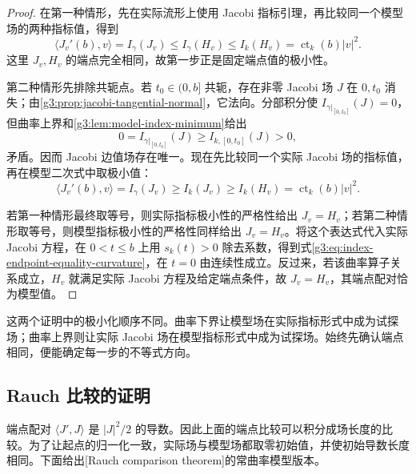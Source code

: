 \begin{proof}
	在第一种情形，先在实际流形上使用 Jacobi 指标引理，再比较同一个模型场的两种指标值，得到
	\[
		\langle J_v'(b),v\rangle
		=I_\gamma(J_v)\le I_\gamma(H_v)
		\le I_k(H_v)=\operatorname{ct}_k(b)|v|^2.
	\]
	这里 \(J_v,H_v\) 的端点完全相同，故第一步正是固定端点值的极小性。

	第二种情形先排除共轭点。若 \(t_0\in(0,b]\) 共轭，存在非零 Jacobi 场 \(J\) 在 \(0,t_0\) 消失；由\cref{g3:prop:jacobi-tangential-normal}，它法向。分部积分使 \(I_{\gamma|_{[0,t_0]}}(J)=0\)，但曲率上界和\cref{g3:lem:model-index-minimum}给出
	\[
		0=I_{\gamma|_{[0,t_0]}}(J)\ge I_{k,[0,t_0]}(J)>0,
	\]
	矛盾。因而 Jacobi 边值场存在唯一。现在先比较同一个实际 Jacobi 场的指标值，再在模型二次式中取极小值：
	\[
		\langle J_v'(b),v\rangle
		=I_\gamma(J_v)\ge I_k(J_v)
		\ge I_k(H_v)=\operatorname{ct}_k(b)|v|^2.
	\]

	若第一种情形最终取等号，则实际指标极小性的严格性给出 \(J_v=H_v\)；若第二种情形取等号，则模型指标极小性的严格性同样给出 \(J_v=H_v\)。将这个表达式代入实际 Jacobi 方程，在 \(0<t\le b\) 上用 \(s_k(t)>0\) 除去系数，得到式\eqref{g3:eq:index-endpoint-equality-curvature}，在 \(t=0\) 由连续性成立。反过来，若该曲率算子关系成立，\(H_v\) 就满足实际 Jacobi 方程及给定端点条件，故 \(J_v=H_v\)，其端点配对恰为模型值。
\end{proof}

这两个证明中的极小化顺序不同。曲率下界让模型场在实际指标形式中成为试探场；曲率上界则让实际 Jacobi 场在模型指标形式中成为试探场。始终先确认端点相同，便能确定每一步的不等式方向。

\subsection{Rauch 比较的证明}
\label{g3:subsec:0701:03}

端点配对 \(\langle J',J\rangle\) 是 \(|J|^2/2\) 的导数。因此上面的端点比较可以积分成场长度的比较。为了让起点的归一化一致，实际场与模型场都取零初始值，并使初始导数长度相同。下面给出[Rauch comparison theorem]的常曲率模型版本。

